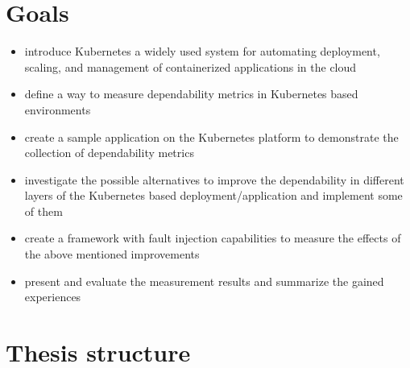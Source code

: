 \section{Goals}

\begin{itemize}
	\item introduce Kubernetes a widely used system for automating deployment, scaling, and management of containerized applications in the cloud
	\item define a way to measure dependability metrics in Kubernetes based environments
	\item create a sample application on the Kubernetes platform to demonstrate the collection of dependability metrics
	\item investigate the possible alternatives to improve the dependability in different layers of the Kubernetes based deployment/application and implement some of them
	\item create a framework with fault injection capabilities to measure the effects of the above mentioned improvements
	\item present and evaluate the measurement results and summarize the gained experiences
\end{itemize}

\section{Thesis structure}
